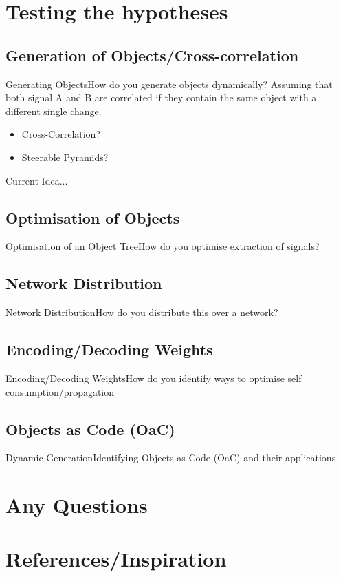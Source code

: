 \documentclass[nocontents]{beamer}
\begin{document}
  \section{Testing the hypotheses}
  \subsection{Generation of  Objects/Cross-correlation}
  \begin{frame}[t]{Generating Objects}{How do you generate objects dynamically?}
    Assuming that both signal A and B are correlated if they contain the same object with a different single change.
    \begin{itemize}
      \item Cross-Correlation?
      \item Steerable Pyramids?
    \end{itemize}

    Current Idea...

    \begin{tikzpicture}

    \end{tikzpicture}
  \end{frame}
  \subsection{Optimisation of Objects }
  \begin{frame}{Optimisation of an Object Tree}{How do you optimise extraction of signals?}

  \end{frame}
  \subsection{Network Distribution}
  \begin{frame}{Network Distribution}{How do you distribute this over a network?}

  \end{frame}
  \subsection{Encoding/Decoding Weights}
  \begin{frame}{Encoding/Decoding Weights}{How do you identify ways to optimise self consumption/propagation}

  \end{frame}
  \subsection{Objects as Code (OaC)}
\begin{frame}{Dynamic Generation}{Identifying Objects as Code (OaC) and their applications}

\end{frame}
\section{Any Questions}
\section{References/Inspiration}
\begin{frame}

\end{frame}
\end{document}
